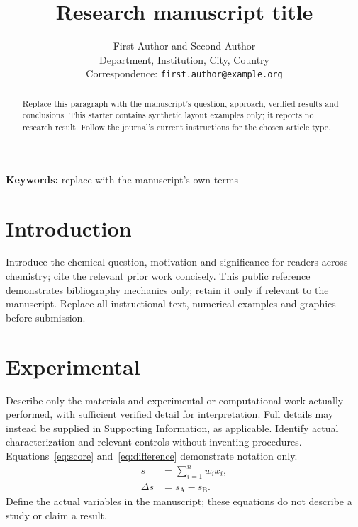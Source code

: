 \documentclass[letterpaper,11pt]{article}
\title{Research manuscript title}
\author{First Author and Second Author\\
  \small Department, Institution, City, Country\\
  \small Correspondence: \texttt{first.author@example.org}}
\date{}
\begin{document}
\maketitle
\begin{abstract}
Replace this paragraph with the manuscript's question, approach, verified
results and conclusions. This starter contains synthetic layout examples
only; it reports no research result. Follow the journal's current instructions
for the chosen article type.
\end{abstract}

\noindent\textbf{Keywords:} replace with the manuscript's own terms

\section{Introduction}\label{sec:introduction}
Introduce the chemical question, motivation and significance for readers
across chemistry; cite the relevant prior work concisely. This public reference demonstrates bibliography mechanics only;
retain it only if relevant to the manuscript\cite{wilkinson2016fair}. Replace
all instructional text, numerical examples and graphics before submission.

\section{Experimental}\label{sec:methods}
Describe only the materials and experimental or computational work actually
performed, with sufficient verified detail for interpretation. Full details
may instead be supplied in Supporting Information, as applicable. Identify
actual characterization and relevant controls without inventing procedures.
Equations~\eqref{eq:score} and~\eqref{eq:difference} demonstrate notation only.
\begin{align}
 s &= \sum_{i=1}^{n} w_i x_i,\label{eq:score}\\
 \Delta s &= s_{\mathrm{A}}-s_{\mathrm{B}}.\label{eq:difference}
\end{align}
Define the actual variables in the manuscript; these equations do not describe
a study or claim a result.
\end{document}

